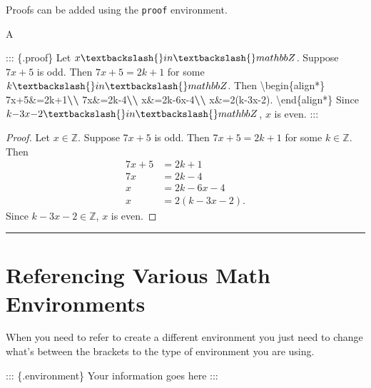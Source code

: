 \documentclass[
]{book}
\newenvironment{Shaded}{\begin{snugshade}}{\end{snugshade}}
\newcommand{\NormalTok}[1]{#1}
\newcommand{\SpecialCharTok}[1]{\textcolor[rgb]{0.81,0.36,0.00}{\textbf{#1}}}
\theoremstyle{definition}
\theoremstyle{definition}
\theoremstyle{definition}
\theoremstyle{definition}
\theoremstyle{remark}
\begin{document}
Proofs can be added using the \texttt{proof} environment.

A

\begin{Shaded}
\begin{Highlighting}[]
\NormalTok{::: \{.proof\}}
\NormalTok{Let $x \textbackslash{}in \textbackslash{}mathbb Z$. Suppose $7x+5$ is odd. Then $7x+5=2k+1$ for some $k \textbackslash{}in \textbackslash{}mathbb Z$. Then}
\NormalTok{\textbackslash{}begin\{align*\}}
\NormalTok{    7x+5\&=2k+1}\SpecialCharTok{\textbackslash{}\textbackslash{}}
\NormalTok{    7x\&=2k{-}4}\SpecialCharTok{\textbackslash{}\textbackslash{}}
\NormalTok{    x\&=2k{-}6x{-}4}\SpecialCharTok{\textbackslash{}\textbackslash{}}
\NormalTok{    x\&=2(k{-}3x{-}2).}
\NormalTok{\textbackslash{}end\{align*\}}
\NormalTok{Since $k{-}3x{-}2 \textbackslash{}in \textbackslash{}mathbb Z$, $x$ is even.}
\NormalTok{:::}
\end{Highlighting}
\end{Shaded}

\begin{proof}
Let \(x \in \mathbb Z\). Suppose \(7x+5\) is odd. Then \(7x+5=2k+1\) for some \(k \in \mathbb Z\). Then
\begin{align*}
    7x+5&=2k+1\\
    7x&=2k-4\\
    x&=2k-6x-4\\
    x&=2(k-3x-2).
\end{align*}
Since \(k-3x-2 \in \mathbb Z\), \(x\) is even.
\end{proof}

\begin{center}\rule{0.5\linewidth}{0.5pt}\end{center}

\section{Referencing Various Math Environments}\label{referencing-various-math-environments}

When you need to refer to create a different environment you just need to change what's between the brackets to the type of environment you are using.

\begin{Shaded}
\begin{Highlighting}[]
\NormalTok{::: \{.environment\}}
\NormalTok{Your information goes here}
\NormalTok{:::}
\end{Highlighting}
\end{Shaded}
\end{document}
